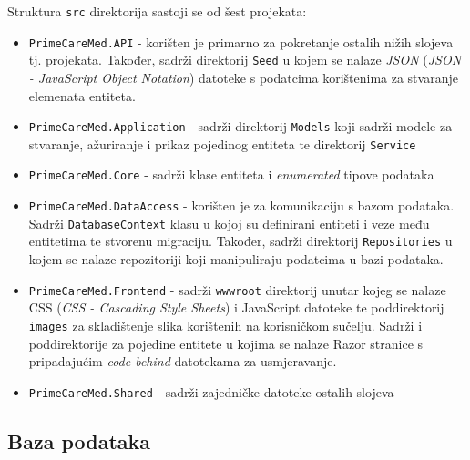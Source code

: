 Struktura \texttt{src} direktorija sastoji se od šest projekata: \\
\begin{itemize}
\item \texttt{PrimeCareMed.API} - korišten je primarno za pokretanje ostalih nižih slojeva tj. projekata. Također, sadrži direktorij \texttt{Seed} u kojem se nalaze \textit{JSON} (\textit{JSON - JavaScript Object Notation}) datoteke s podatcima korištenima za stvaranje elemenata entiteta.

\item \texttt{PrimeCareMed.Application} - sadrži direktorij \texttt{Models} koji sadrži modele za stvaranje, ažuriranje i prikaz pojedinog entiteta te direktorij \texttt{Service}

\item \texttt{PrimeCareMed.Core} - sadrži klase entiteta i \textit{enumerated} tipove podataka 

\item \texttt{PrimeCareMed.DataAccess} - korišten je za komunikaciju s bazom podataka. Sadrži \texttt{DatabaseContext} klasu u kojoj su definirani entiteti i veze među entitetima te stvorenu migraciju. Također, sadrži direktorij \texttt{Repositories} u kojem se nalaze repozitoriji koji manipuliraju podatcima u bazi podataka.

\item \texttt{PrimeCareMed.Frontend} - sadrži \texttt{wwwroot} direktorij unutar kojeg se nalaze CSS (\textit{CSS - Cascading Style Sheets}) i JavaScript datoteke te poddirektorij \texttt{images} za skladištenje slika korištenih na korisničkom sučelju. Sadrži i poddirektorije za pojedine entitete u kojima se nalaze Razor stranice s pripadajućim \textit{code-behind} datotekama za usmjeravanje.

\item \texttt{PrimeCareMed.Shared} - sadrži zajedničke datoteke ostalih slojeva
\end{itemize}

\subsection{Baza podataka}
